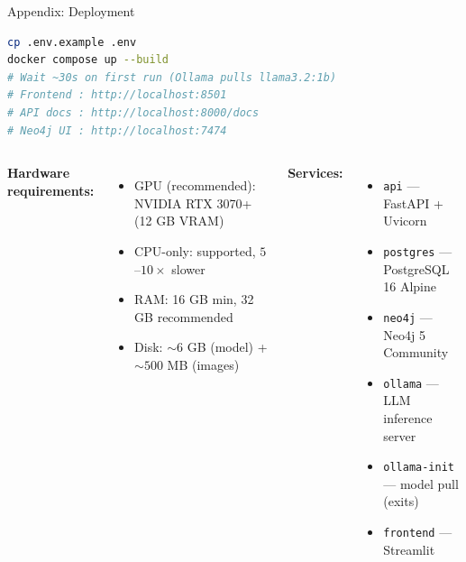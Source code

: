 \documentclass[aspectratio=169,9pt]{beamer}
\begin{document}
\appendix
\begin{frame}[fragile]{Appendix: Deployment}
\begin{lstlisting}[language=bash, caption={One-command deployment.}]
cp .env.example .env
docker compose up --build
# Wait ~30s on first run (Ollama pulls llama3.2:1b)
# Frontend : http://localhost:8501
# API docs : http://localhost:8000/docs
# Neo4j UI : http://localhost:7474
\end{lstlisting}

\vspace{0.4cm}
\begin{columns}[T]
  \textbf{Hardware requirements:}
  \begin{itemize}
    \item GPU (recommended): NVIDIA RTX 3070+ (12 GB VRAM)
    \item CPU-only: supported, $5$--$10\times$ slower
    \item RAM: 16 GB min, 32 GB recommended
    \item Disk: $\sim6$ GB (model) + $\sim500$ MB (images)
  \end{itemize}

  \textbf{Services:}
  \begin{itemize}
    \item \texttt{api} — FastAPI + Uvicorn
    \item \texttt{postgres} — PostgreSQL 16 Alpine
    \item \texttt{neo4j} — Neo4j 5 Community
    \item \texttt{ollama} — LLM inference server
    \item \texttt{ollama-init} — model pull (exits)
    \item \texttt{frontend} — Streamlit
  \end{itemize}
\end{columns}
\end{frame}
\end{document}
